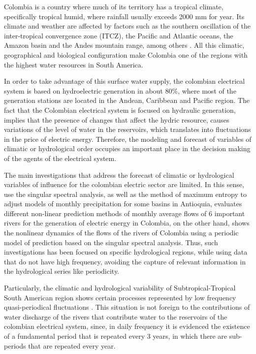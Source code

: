 \documentclass[12pt,halfline,a4paper]{ouparticle}
\begin{document}
Colombia is a country where much of its territory has a tropical climate, specifically tropical humid, where rainfall usually exceeds 2000 mm for year. Its climate and weather are affected by factors such as the southern oscillation of the inter-tropical convergence zone (ITCZ), the Pacific and Atlantic oceans, the Amazon basin and the Andes mountain range, among others \citep{Marin2006}. All this climatic, geographical and biological configuration make Colombia one of the regions with the highest water resources in South America.

In order to take advantage of this surface water supply, the colombian electrical system is based on hydroelectric generation in about 80$\%$, where most of the generation stations are located in the Andean, Caribbean and Pacific region. The fact that the Colombian electrical system is focused on hydraulic generation, implies that the presence of changes that affect the hydric resource, causes variations of the level of water in the reservoirs, which translates into fluctuations in the price of electric energy. Therefore, the modeling and forecast of variables of climatic or hydrological order occupies an important place in the decision making of the agents of the electrical system.

The main investigations that address the forecast of climatic or hydrological variables of influence for the colombian electric sector are limited. In this sense, \cite{Salazar1998} use the singular spectral analysis, as well as the method of maximum entropy to adjust models of monthly precipitation for some basins in Antioquia, \cite{Poveda2002} evaluates different non-linear prediction methods of monthly average flows of 6 important rivers for the generation of electric energy in Colombia, \cite{Rojo-Hernandez2010} on the other hand, shows the nonlinear dynamics of the flows of the rivers of Colombia using a periodic model of prediction based on the singular spectral analysis. Thus, such investigations has been focused on specific hydrological regions, while using data that do not have high frequency, avoiding the capture of relevant information in the hydrological series like periodicity.

Particularly, the climatic and hydrological variability of Subtropical-Tropical South American region shows certain processes represented by low frequency quasi-periodical fluctuations \citep{Vargas2002}. This situation is not foreign to the contributions of water discharge of the rivers that contribute water to the reservoirs of the colombian electrical system, since, in daily frequency it is evidenced the existence of a fundamental period that is repeated every 3 years, in which there are sub-periods that are repeated every year.
\end{document}
